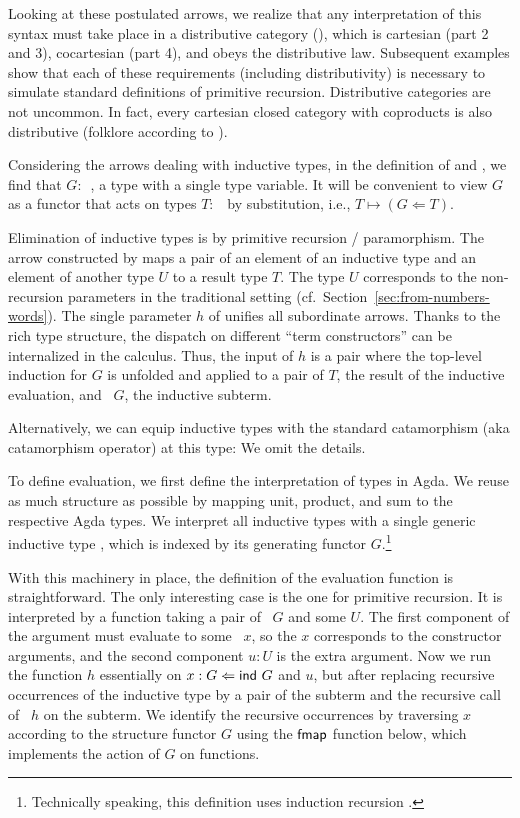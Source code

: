 \documentclass{jfp}
\begin{document}
Looking at these postulated arrows, we realize that any interpretation
of this syntax must take place in a distributive category
(\cite{cockett_1993}), which is  cartesian (part 2 and 3), cocartesian
(part 4), and obeys the distributive law. Subsequent examples show
that each of these requirements (including distributivity) is
necessary to simulate standard definitions of primitive recursion. 
Distributive categories are not uncommon. In fact, every cartesian
closed category with coproducts is also distributive (folklore
according to \cite{https://doi.org/10.48550/arxiv.1406.0961}).

Considering the arrows dealing with inductive types, 
in the definition of {\Acon} and {\AP}, we find that $G :$~, a type with a
single type variable. It will be convenient to view $G$ as a functor
that acts on types $T:$~{\ATY} by substitution, i.e., $T \mapsto (G
\Leftarrow T)$. 

Elimination of inductive types is by primitive recursion /
paramorphism. The arrow constructed by {\AP} maps a pair of an element
of an inductive type and an element of another type $U$ to a result type
$T$. The type $U$ corresponds to the non-recursion parameters in the
traditional setting (cf.\ Section~\ref{sec:from-numbers-words}). 
The single parameter $h$ of {\AP} unifies all subordinate
arrows. Thanks to the rich type structure, the dispatch on different
``term constructors'' can be internalized in the calculus. Thus, the
input of $h$ is a pair where the top-level induction for $G$ is
unfolded and applied to a pair of $T$, the result of the inductive
evaluation, and \Aind~$G$, the inductive subterm.

Alternatively, we can equip inductive types with the standard
catamorphism (aka catamorphism operator) at this type:
\ccDataPRF
We omit the details.

To define evaluation, we first define the interpretation of types in Agda.
\ccDataAlg
We reuse as much structure as possible by mapping unit, product, and
sum to the respective Agda types. We interpret all inductive types with a
single generic inductive type , which is indexed by its generating
functor $G$.\footnote{Technically speaking, this definition uses
  induction recursion \cite{DBLP:journals/apal/DybjerS03}.}

With this machinery in place, the definition of the evaluation
function is straightforward.
\ccFunEval
The only interesting case is the one for primitive recursion. It is
interpreted by a function taking a pair of \Aind~$G$ and some $U$. The
first component of the argument must evaluate to some \Acon~$x$, so the $x$ corresponds
to the constructor arguments, and the second component $u:U$ is the
extra argument. Now we run the function $h$ essentially on
$x :{} G \Leftarrow \Aind~G$ and $u$, but 
after replacing recursive occurrences of the inductive type by a pair
of the subterm and the recursive call of {\AP}~$h$ on the subterm. We
identify the recursive occurrences by traversing $x$ according to the
structure functor $G$ using the $\Afmap$ function below, which
implements the action of $G$ on functions. 
\ccFunFmap
\end{document}

